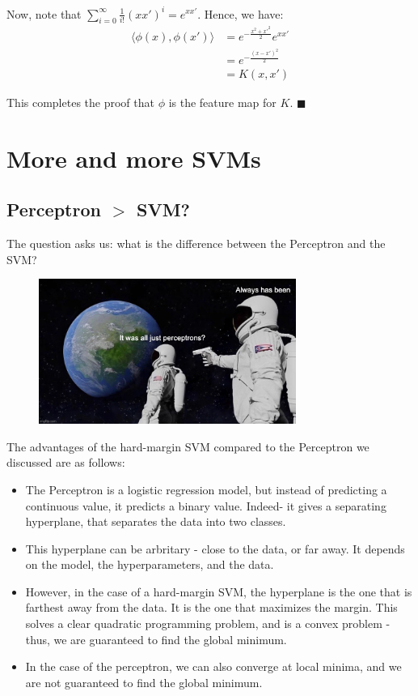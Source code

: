 \documentclass[a4paper]{article}
\begin{document}
Now, note that $\sum_{i=0}^{\infty} \frac{1}{i!} (xx')^i = e^{xx'}$. Hence, we have:
\begin{align*}
    \langle \phi(x), \phi(x') \rangle &= e^{-\frac{x^2 + x'^2}{2}} e^{xx'} \\
    &= e^{-\frac{(x-x')^2}{2}} \\
    &= K(x, x')
\end{align*}

This completes the proof that $\phi$ is the feature map for $K$. $\blacksquare$\\

\newpage

\section{More and more SVMs}

\subsection{Perceptron $>$ SVM?}

The question asks us: what is the difference between the Perceptron and the SVM?
\begin{figure}[h]
    \centering
    \includegraphics[width=0.75\textwidth]{figures/perceptron.jpg}
\end{figure}

The advantages of the hard-margin SVM compared to the Perceptron we discussed are as follows:
\begin{itemize}
    \item The Perceptron is a logistic regression model, but instead of predicting a continuous value, it predicts a binary value. Indeed- it gives a separating hyperplane, that separates the data into two classes.
    \item This hyperplane can be arbritary - close to the data, or far away. It depends on the model, the hyperparameters, and the data.
    \item However, in the case of a hard-margin SVM, the hyperplane is the one that is farthest away from the data. It is the one that maximizes the margin. This solves a clear quadratic programming problem, and is a convex problem - thus, we are guaranteed to find the global minimum.
    \item In the case of the perceptron, we can also converge at local minima, and we are not guaranteed to find the global minimum.
\end{itemize}
\end{document}
